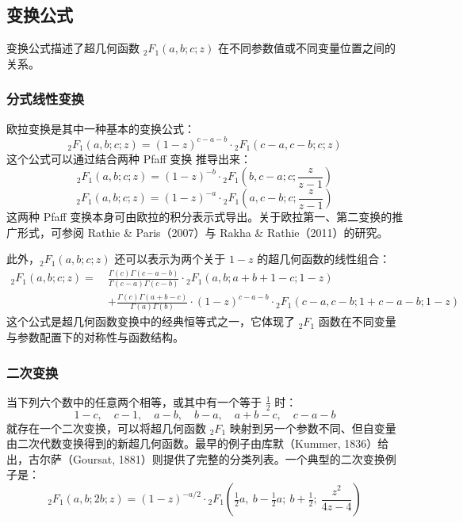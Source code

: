 \subsection{变换公式}
变换公式描述了超几何函数 ${}_2F_1(a, b; c; z)$ 在不同参数值或不同变量位置之间的关系。
\subsubsection{分式线性变换}
欧拉变换是其中一种基本的变换公式：
$$
{}_2F_1(a, b; c; z) = (1 - z)^{c - a - b} \cdot {}_2F_1(c - a, c - b; c; z)~
$$
这个公式可以通过结合两种 Pfaff 变换 推导出来：
$$
{}_2F_1(a, b; c; z) = (1 - z)^{-b} \cdot {}_2F_1\left(b, c - a; c; \frac{z}{z - 1}\right)~
$$
$$
{}_2F_1(a, b; c; z) = (1 - z)^{-a} \cdot {}_2F_1\left(a, c - b; c; \frac{z}{z - 1}\right)~
$$
这两种 Pfaff 变换本身可由欧拉的积分表示式导出。关于欧拉第一、第二变换的推广形式，可参阅 Rathie & Paris（2007）与 Rakha & Rathie（2011）的研究。

此外，${}_2F_1(a, b; c; z)$ 还可以表示为两个关于 $1 - z$ 的超几何函数的线性组合：
$$
\begin{aligned}
{}_2F_1(a, b; c; z) =\ & \frac{\Gamma(c) \Gamma(c - a - b)}{\Gamma(c - a) \Gamma(c - b)} \cdot {}_2F_1(a, b; a + b + 1 - c; 1 - z) \\
&+ \frac{\Gamma(c) \Gamma(a + b - c)}{\Gamma(a) \Gamma(b)} \cdot (1 - z)^{c - a - b} \cdot {}_2F_1(c - a, c - b; 1 + c - a - b; 1 - z)
\end{aligned}~
$$
这个公式是超几何函数变换中的经典恒等式之一，它体现了 ${}_2F_1$ 函数在不同变量与参数配置下的对称性与函数结构。
\subsubsection{二次变换}
当下列六个数中的任意两个相等，或其中有一个等于 $\tfrac{1}{2}$ 时：
$$
1 - c,\quad c - 1,\quad a - b,\quad b - a,\quad a + b - c,\quad c - a - b~
$$
就存在一个二次变换，可以将超几何函数 ${}_2F_1$ 映射到另一个参数不同、但自变量由二次代数变换得到的新超几何函数。最早的例子由库默（Kummer, 1836）给出，古尔萨（Goursat, 1881）则提供了完整的分类列表。一个典型的二次变换例子是：
$$
{}_2F_1(a, b; 2b; z) =
(1 - z)^{-a/2} \cdot {}_2F_1\left(\tfrac{1}{2}a,\ b - \tfrac{1}{2}a;\ b + \tfrac{1}{2};\ \frac{z^2}{4z - 4}\right)~
$$

